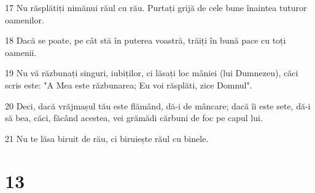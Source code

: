\par 17 Nu răsplătiți nimănui răul cu rău. Purtați grijă de cele bune înaintea tuturor oamenilor.
\par 18 Dacă se poate, pe cât stă în puterea voastră, trăiți în bună pace cu toți oamenii.
\par 19 Nu vă răzbunați singuri, iubiților, ci lăsați loc mâniei (lui Dumnezeu), căci scris este: "A Mea este răzbunarea; Eu voi răsplăti, zice Domnul".
\par 20 Deci, dacă vrăjmașul tău este flămând, dă-i de mâncare; dacă îi este sete, dă-i să bea, căci, făcând acestea, vei grămădi cărbuni de foc pe capul lui.
\par 21 Nu te lăsa biruit de rău, ci biruiește răul cu binele.

\chapter{13}

